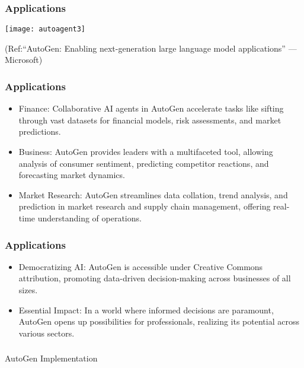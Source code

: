 \begin{frame}[fragile]\frametitle{Applications}
	
	\begin{center}
	\texttt{[image: autoagent3]}
	\end{center}
	
{\tiny (Ref:“AutoGen: Enabling next-generation large language model applications” — Microsoft)}
\end{frame}

\begin{frame}[fragile]\frametitle{Applications}
  \begin{itemize}
    \item Finance: Collaborative AI agents in AutoGen accelerate tasks like sifting through vast datasets for financial models, risk assessments, and market predictions.
    \item Business: AutoGen provides leaders with a multifaceted tool, allowing analysis of consumer sentiment, predicting competitor reactions, and forecasting market dynamics.
    \item Market Research: AutoGen streamlines data collation, trend analysis, and prediction in market research and supply chain management, offering real-time understanding of operations.
  \end{itemize}
\end{frame}

\begin{frame}[fragile]\frametitle{Applications}
  \begin{itemize}
    \item Democratizing AI: AutoGen is accessible under Creative Commons attribution, promoting data-driven decision-making across businesses of all sizes.
    \item Essential Impact: In a world where informed decisions are paramount, AutoGen opens up possibilities for professionals, realizing its potential across various sectors.
  \end{itemize}
\end{frame}

\begin{frame}[fragile]\frametitle{}
\begin{center}
{\Large AutoGen Implementation}
\end{center}
\end{frame}


